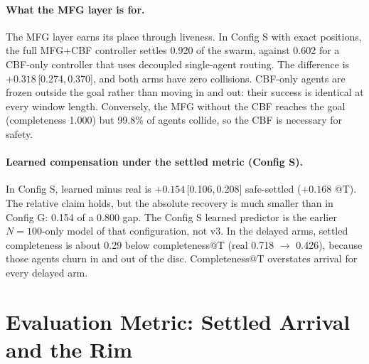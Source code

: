 \documentclass{article}
\newcommand{\ci}[2]{\,[#1,\,#2]}
\begin{document}
\paragraph{What the MFG layer is for.}
The MFG layer earns its place through liveness. In Config S with exact positions, the full MFG+CBF
controller settles 0.920 of the swarm, against 0.602 for a CBF-only controller that uses decoupled
single-agent routing. The difference is $+0.318$\ci{0.274}{0.370}, and both arms have zero
collisions. CBF-only agents are frozen outside the goal rather than moving in and out: their
success is identical at every window length.
Conversely, the MFG without the CBF reaches the goal (completeness 1.000) but 99.8\% of agents
collide, so the CBF is necessary for safety.

\paragraph{Learned compensation under the settled metric (Config S).}
In Config S, learned minus real is $+0.154$\ci{0.106}{0.208} safe-settled ($+0.168$ @T). The
relative claim holds, but the absolute recovery is much smaller than in Config G: 0.154 of a
0.800 gap.
The Config S learned predictor is the earlier $N=100$-only model of that configuration, not v3.
In the delayed arms, settled completeness is about 0.29 below completeness@T (real 0.718 $\to$
0.426), because those agents churn in and out of the disc. Completeness@T overstates arrival for
every delayed arm.

\section{Evaluation Metric: Settled Arrival and the Rim}
\label{sec:metric}
\end{document}
